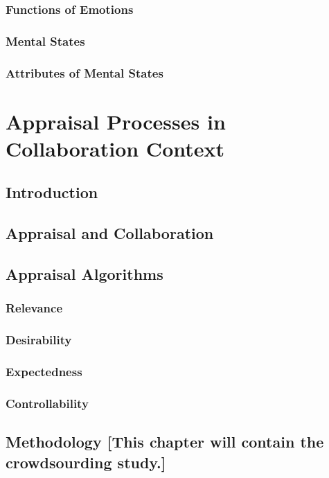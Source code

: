 \documentclass[12pt]{report}
\begin{document}
\subsection{Functions of Emotions}

\subsection{Mental States}

\subsection{Attributes of Mental States}

\chapter{Appraisal Processes in Collaboration Context}
\label{ch:appraisals}

\section{Introduction}

\section{Appraisal and Collaboration}

\section{Appraisal Algorithms}

\subsection{Relevance}

\subsection{Desirability}

\subsection{Expectedness}

\subsection{Controllability}

\section{Methodology [This chapter will contain the crowdsourding study.]}
\end{document}
